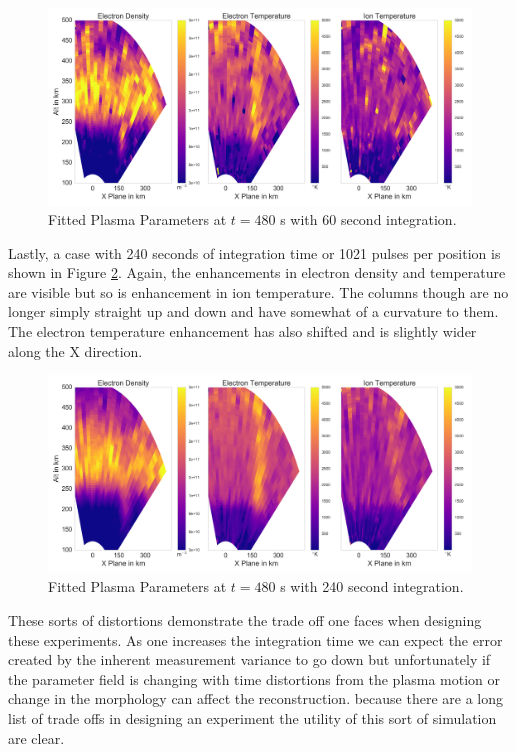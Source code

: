 \documentclass[draft,ras]{agutex}
\begin{document}
\begin{article}


\begin{figure}[!t]
\centering
\includegraphics[width=5in]{0480_60_int}
\caption{Fitted Plasma Parameters at $t=480$ s with 60 second integration.}
\label{fig:fplparamst60}
\end{figure}

Lastly, a case with 240 seconds of integration time or 1021 pulses per position is shown in Figure \ref{fig:f240plparamst60}. Again, the enhancements in electron density and temperature are visible but so is enhancement in ion temperature. The columns though are no longer simply straight up and down and have somewhat of a curvature to them. The electron temperature enhancement has also shifted and is slightly wider along the X direction. 

\begin{figure}[!t]
\centering
\includegraphics[width=5in]{0480_240_int}
\caption{Fitted Plasma Parameters at $t=480$ s with 240 second integration.}
\label{fig:f240plparamst60}
\end{figure}

These sorts of distortions demonstrate the trade off one faces when designing these experiments. As one increases the integration time we can expect the error created by the inherent measurement variance to go down but unfortunately if the parameter field is changing with time distortions from the plasma motion or change in the morphology can affect the reconstruction. because there are a long list of trade offs in designing an experiment the utility of this sort of simulation are clear. 

\end{article}
\end{document}
